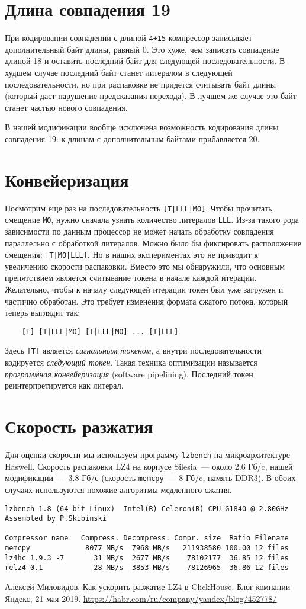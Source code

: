 \documentclass[russian,a4paper,12pt]{article}
\begin{document}
\section{Длина совпадения 19}
При кодировании совпадении с длиной \verb|4+15| компрессор записывает дополнительный байт длины, равный 0.
Это хуже, чем записать совпадение длиной 18 и оставить последний байт для следующей последовательности.
В худшем случае последний байт станет литералом в следующей последовательности, но при распаковке не придется
считывать байт длины (который даст нарушение предсказания перехода).  В лучшем же случае это байт
станет частью нового совпадения.

В нашей модификации вообще исключена возможность кодирования длины совпадения 19: к длинам с дополнительным
байтами прибавляется 20.

\section{Конвейеризация}
Посмотрим еще раз на последовательность \verb![T|LLL|MO]!.  Чтобы прочитать смещение \verb|MO|,
нужно сначала узнать количество литералов \verb|LLL|.  Из-за такого рода зависимости по данным
процессор не может начать обработку совпадения параллельно с обработкой литералов.  Можно было бы
фиксировать расположение смещения: \verb![T|MO|LLL]!.  Но в наших экспериментах это не приводит
к увеличению скорости распаковки.  Вместо это мы обнаружили, что основным препятствием является
считывание токена в начале каждой итерации.  Желательно, чтобы к началу следующей итерации токен
был уже загружен и частично обработан.  Это требует изменения формата сжатого потока, который
теперь выглядит так:
\begin{verbatim}
    [T] [T|LLL|MO] [T|LLL|MO] ... [T|LLL]
\end{verbatim}
Здесь \verb![T]! является \emph{сигнальным токеном}, а внутри последовательности кодируется
\emph{следующий токен}.  Такая техника оптимизации называется \emph{программная конвейеризация}
(software pipelining).  Последний токен реинтерпретируется как литерал.

\section{Скорость разжатия}
Для оценки скорости мы используем программу \verb|lzbench| на микроархитектуре Haswell.
Скорость распаковки LZ4 на корпусе Silesia~--- около 2.6 Гб/c, нашей модификации~--- 3.8 Гб/с
(скорость \verb|memcpy|~--- 8 Гб/c, память DDR3).  В обоих случаях используются похожие алгоритмы медленного сжатия.
\begin{verbatim}
lzbench 1.8 (64-bit Linux)  Intel(R) Celeron(R) CPU G1840 @ 2.80GHz
Assembled by P.Skibinski

Compressor name   Compress. Decompress. Compr. size  Ratio Filename
memcpy             8077 MB/s  7968 MB/s   211938580 100.00 12 files
lz4hc 1.9.3 -7       31 MB/s  2677 MB/s    78102177  36.85 12 files
relz4 0.1            28 MB/s  3853 MB/s    78126965  36.86 12 files
\end{verbatim}

\begin{thebibliography}{9}
 Алексей Миловидов.
Как ускорить разжатие LZ4 в ClickHouse.
Блог компании Яндекс, 21 мая 2019.
\url{https://habr.com/ru/company/yandex/blog/452778/}
\end{thebibliography}
\end{document}
